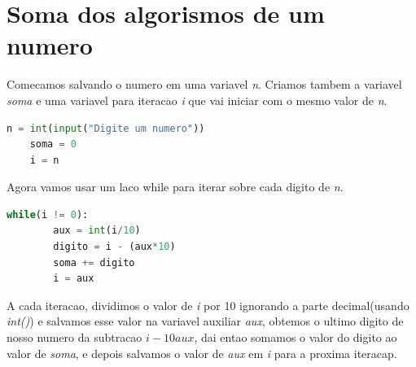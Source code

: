 \documentclass{article}
\begin{document}
\section{Soma dos algorismos de um numero}

Comecamos salvando o numero em uma variavel \textit{n}. Criamos tambem a variavel \textit{soma} e uma variavel para iteracao \textit{i} que vai iniciar com o mesmo valor de \textit{n}.

    \begin{lstlisting}[language=Python]
    n = int(input("Digite um numero"))
    soma = 0
    i = n\end{lstlisting}

Agora vamos usar um laco while para iterar sobre cada digito de \textit{n}.

\begin{lstlisting}[language=Python]
     while(i != 0):
        aux = int(i/10)
        digito = i - (aux*10)
        soma += digito
        i = aux\end{lstlisting}

A cada iteracao, dividimos o valor de \textit{i} por 10 ignorando a parte decimal(usando \textit{int()}) e salvamos esse valor na variavel auxiliar \textit{aux}, obtemos o ultimo digito de nosso numero da subtracao $i - 10\textit{aux}$, dai entao somamos o valor do digito ao valor de \textit{soma}, e depois salvamos o valor de \textit{aux} em \textit{i} para a proxima iteracap.
\end{document}
